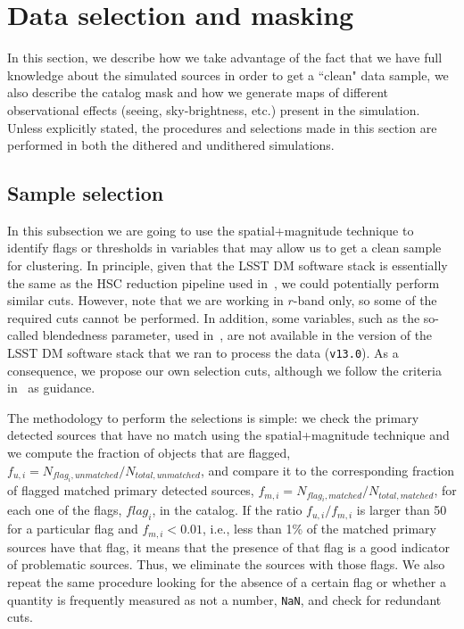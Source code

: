 \documentclass[\docopts]{\docclass}
\begin{document}
\section{Data selection and masking}
\label{sec:data_selection}
In this section, we describe how we take advantage of the fact that we have full knowledge about the simulated sources in order to get a ``clean" data sample, we also describe the catalog mask and how we generate maps of different observational effects (seeing, sky-brightness, etc.) present in the simulation. Unless explicitly stated, the procedures and selections made in this section are performed in both the dithered and undithered simulations.

\subsection{Sample selection}
\label{ssec:sample_selection}

In this subsection we are going to use the spatial+magnitude technique to identify flags or thresholds in variables that may allow us to get a clean sample for clustering. In principle, given that the LSST DM software stack is essentially the same as the HSC reduction pipeline used in~\citet{2018PASJ...70S..25M}, we could potentially perform similar cuts. However, note that we are working in $r$-band only, so some of the required cuts cannot be performed. In addition, some variables, such as the so-called blendedness parameter, used in~\citet{2018PASJ...70S..25M}, are not available in the version of the LSST DM software stack that we ran to process the data (\texttt{v13.0}). As a consequence, we propose our own selection cuts, although we follow the criteria in~\citet{2018PASJ...70S..25M} as guidance.


The methodology to perform the selections is simple: we check the primary detected sources that have no match using the spatial+magnitude technique and we compute the fraction of objects that are flagged, $f_{u,i} = N_{flag_{i}, unmatched}/N_{total, unmatched}$, and compare it to the corresponding fraction of flagged matched primary detected sources, $f_{m,i} = N_{flag_{i}, matched}/N_{total, matched}$, for each one of the flags, $flag_{i}$, in the catalog. If the ratio $f_{u,i}/f_{m,i}$ is larger than 50 for a particular flag and $f_{m,i} < 0.01$, i.e., less than 1\% of the matched primary sources have that flag, it means that the presence of that flag is a good indicator of problematic sources. Thus, we eliminate the sources with those flags. We also repeat the same procedure looking for the absence of a certain flag or whether a quantity is frequently measured as not a number, \texttt{NaN}, and check for redundant cuts. 
\end{document}
